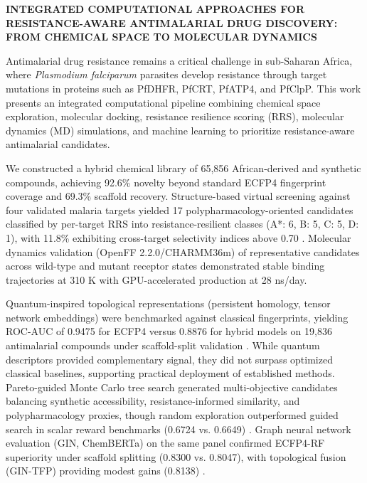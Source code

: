 \documentclass[12pt,a4paper]{article}
\begin{document}
	\begin{center}
		{\large{\bf INTEGRATED COMPUTATIONAL APPROACHES FOR RESISTANCE-AWARE ANTIMALARIAL DRUG DISCOVERY: FROM CHEMICAL SPACE TO MOLECULAR DYNAMICS} }
		\\
		
	\end{center}
	
	\noindent
	Antimalarial drug resistance remains a critical challenge in sub-Saharan Africa, where \textit{Plasmodium falciparum} parasites develop resistance through target mutations in proteins such as PfDHFR, PfCRT, PfATP4, and PfClpP. This work presents an integrated computational pipeline combining chemical space exploration, molecular docking, resistance resilience scoring (RRS), molecular dynamics (MD) simulations, and machine learning to prioritize resistance-aware antimalarial candidates.
	
	We constructed a hybrid chemical library of 65,856 African-derived and synthetic compounds, achieving 92.6\% novelty beyond standard ECFP4 fingerprint coverage and 69.3\% scaffold recovery. Structure-based virtual screening against four validated malaria targets yielded 17 polypharmacology-oriented candidates classified by per-target RRS into resistance-resilient classes (A*: 6, B: 5, C: 5, D: 1), with 11.8\% exhibiting cross-target selectivity indices above 0.70 \cite{sao2026polypharm}. Molecular dynamics validation (OpenFF 2.2.0/CHARMM36m) of representative candidates across wild-type and mutant receptor states demonstrated stable binding trajectories at 310 K with GPU-accelerated production at 28 ns/day.
	
	Quantum-inspired topological representations (persistent homology, tensor network embeddings) were benchmarked against classical fingerprints, yielding ROC-AUC of 0.9475 for ECFP4 versus 0.8876 for hybrid models on 19,836 antimalarial compounds under scaffold-split validation \cite{sao2026quantum}. While quantum descriptors provided complementary signal, they did not surpass optimized classical baselines, supporting practical deployment of established methods. Pareto-guided Monte Carlo tree search generated multi-objective candidates balancing synthetic accessibility, resistance-informed similarity, and polypharmacology proxies, though random exploration outperformed guided search in scalar reward benchmarks (0.6724 vs. 0.6649) \cite{sao2026mcts}. Graph neural network evaluation (GIN, ChemBERTa) on the same panel confirmed ECFP4-RF superiority under scaffold splitting (0.8300 vs. 0.8047), with topological fusion (GIN-TFP) providing modest gains (0.8138) \cite{sao2026gnn}.
	
\end{document}
